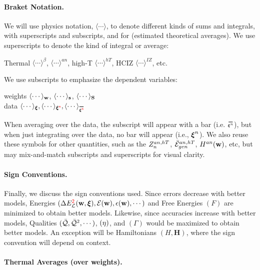 \paragraph{Braket Notation.}
We will use physics \BraKet notation, $\langle\cdots\rangle$,
to denote different kinds of sums and integrals, with superscripts and subscripts,
and for \ExpectedValues (estimated theoretical averages).
We use superscripts to denote the kind of integral or average:
\begin{center}
Thermal $\langle\cdots\rangle^{\beta}$,
\Annealed $\langle\cdots\rangle^{an}$,
high-T $\langle\cdots\rangle^{hT}$,
HCIZ $\langle\cdots\rangle^{IZ}$, etc.
\end{center}
We use subscripts to emphasize the dependent variables:
\begin{center}
  weights $\langle\cdots\rangle_{{\mathbf{w}}}$, $\langle\cdots\rangle_{{\mathbf{s}}}$, $\langle\cdots\rangle_{{\mathbf{S}}}$ \\ \nonumber
    \vspace{0.33cm}  %
data $\langle\cdots\rangle_{\XI},
\langle\cdots\rangle_{\NDXI},
\langle\cdots\rangle_{\AVGNDXI}$
\end{center}
When averaging over the data, the subscript will appear with a bar (i.e. $\AVGNDXIn$), but when just integrating over the data, no bar will appear (i.e., $\boldsymbol{\xi}^{n}$). 
We also reuse these symbols for other quantities, such as the $Z^{an,hT}_{n}$, $\bar{\mathcal{E}}_{gen}^{an,hT}$, $H^{an}({\mathbf{w}})$, etc,
but may mix-and-match subscripts and superscripts for visual clarity.

\paragraph{Sign Conventions.}
Finally, we discuss the sign conventions used.  Since errors decrease with better models,
Energies $(\Delta E^{{\color{red}\sf{2}}}_{\mathcal{L}}(\mathbf{w},\boldsymbol{\xi}), \mathcal{E}(\mathbf{w}), \epsilon({\mathbf{w}}), \cdots)$ and Free Energies $(F)$ are minimized to obtain better models.
Likewise, since accuracies increase with better models, Qualities $(\bar{\mathcal{Q}}, \bar{\mathcal{Q}}^{2}, \cdots)$,
\SelfOverlap $(\eta)$, and \Quality \GeneratingFunction $(\Gamma)$ would be maximized to obtain better models.
An exception will be Hamiltonians $(H,\mathbf{H})$, where the sign convention will depend on context.

\paragraph{Thermal Averages (over weights).}

